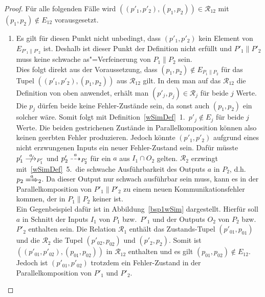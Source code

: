 \begin{proof}
  Für alle folgenden Fälle wird $((p'_1,p'_2),(p_1,p_2))\in\mathcal{R}_{12}$
  mit $(p_1,p_2)\notin E_{12}$ vorausgesetzt.
  \begin{enumerate}
    \item Es gilt für diesen Punkt nicht unbedingt, dass $(p'_1,p'_2)$ kein
      Element von $E_{P'_1\|P'_2}$ ist. Deshalb ist dieser Punkt der Definition
      nicht erfüllt und $P'_1\|P'_2$ muss keine schwache as"=Verfeinerung von
      $P_1\|P_2$ sein.\\
      Dies folgt direkt aus der Voraussetzung, dass $(p_1,p_2)\notin
      E_{P_1\|P_2}$ für das Tupel $((p'_1,p'_2),(p_1,p_2))$ aus
      $\mathcal{R}_{12}$ gilt. In dem man auf das $\mathcal{R}_{12}$ die
      Definition von oben anwendet, erhält man $(p'_j,p_j)\in\mathcal{R}_j$ für
      beide $j$ Werte. Die $p_j$ dürfen beide keine Fehler-Zustände sein, da
      sonst auch $(p_1,p_2)$ ein solcher wäre. Somit folgt mit
      Definition~\ref{wSimDef}~1.\ $p'_j\notin E_j$ für beide $j$ Werte. Die
      beiden gestrichenen Zustände in Parallelkomposition können also keinen
      geerbten Fehler produzieren. Jedoch könnte $(p'_1,p'_2)$ aufgrund eines
      nicht erzwungenen Inputs ein neuer Fehler-Zustand sein. Dafür müsste
      \oBdA{} $p'_1\nmust[a]_{P'_1}$ und $p'_2\may[a]_{P'_2}$ für ein $a$ aus
      $I_1\cap O_2$ gelten. $\mathcal{R}_2$ erzwingt mit~\ref{wSimDef}~5.\ die
      schwache Ausführbarkeit des Outputs $a$ in $P_2$, d.h.\ $p_2
      \weakmay[a]_2$. Da dieser Output nur schwach ausführbar sein muss, kann
      es in der Parallelkomposition von $P'_1\|P'_2$ zu einem neuen
      Kommunikationsfehler kommen, der in $P_1\|P_2$ keiner ist.\\
      Ein Gegenbeispiel dafür ist in Abbildung~\ref{bsp1wSim} dargestellt.
      Hierfür soll $a$ in Schnitt der Inputs $I_1$ von $P_1$ bzw.\ $P'_1$ und
      der Outputs $O_2$ von $P_2$ bzw.\ $P'_2$ enthalten sein. Die Relation
      $\mathcal{R}_1$ enthält das Zustands-Tupel $(p'_{01},p_{01})$ und die
      $\mathcal{R}_2$ die Tupel $(p'_{02},p_{02})$ und $(p'_2,p_2)$. Somit ist
      $((p'_{01},p'_{02}),(p_{01},p_{02}))$ in $\mathcal{R}_{12}$ enthalten und
      es gilt $(p_{01},p_{02})\notin E_{12}$. Jedoch ist $(p'_{01},p'_{02})$
      trotzdem ein Fehler-Zustand in der Parallelkomposition von $P'_1$ und
      $P'_2$.
      \\ 

    \begin{figure}[htbp]
      \begin{center}
\end{center}
\end{figure}
\end{enumerate}
\end{proof}
